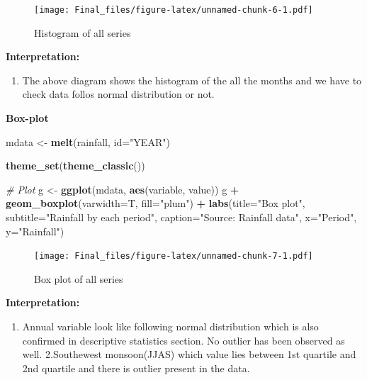 \documentclass[12pt,openany]{book}
\newenvironment{Shaded}{\begin{snugshade}}{\end{snugshade}}
\newcommand{\CommentTok}[1]{\textcolor[rgb]{0.56,0.35,0.01}{\textit{#1}}}
\newcommand{\DataTypeTok}[1]{\textcolor[rgb]{0.13,0.29,0.53}{#1}}
\newcommand{\KeywordTok}[1]{\textcolor[rgb]{0.13,0.29,0.53}{\textbf{#1}}}
\newcommand{\NormalTok}[1]{#1}
\newcommand{\OperatorTok}[1]{\textcolor[rgb]{0.81,0.36,0.00}{\textbf{#1}}}
\newcommand{\StringTok}[1]{\textcolor[rgb]{0.31,0.60,0.02}{#1}}
\providecommand{\tightlist}{%
  \setlength{\itemsep}{0pt}\setlength{\parskip}{0pt}}
\begin{document}
\begin{figure}
\centering
\texttt{[image: Final\_files/figure-latex/unnamed-chunk-6-1.pdf]}
\caption{\label{fig:unnamed-chunk-6}Histogram of all series}
\end{figure}

\textbf{Interpretation:}

\begin{enumerate}
\def\labelenumi{\arabic{enumi}.}
\tightlist
\item
  The above diagram shows the histogram of the all the months and we have to check data follos normal distribution or not.
\end{enumerate}

\textbf{Box-plot}

\begin{Shaded}
\begin{Highlighting}[]
\NormalTok{mdata <-}\StringTok{ }\KeywordTok{melt}\NormalTok{(rainfall, }\DataTypeTok{id=}\StringTok{"YEAR"}\NormalTok{)}

\KeywordTok{theme_set}\NormalTok{(}\KeywordTok{theme_classic}\NormalTok{())}

\CommentTok{# Plot}
\NormalTok{g <-}\StringTok{ }\KeywordTok{ggplot}\NormalTok{(mdata, }\KeywordTok{aes}\NormalTok{(variable, value))}
\NormalTok{g }\OperatorTok{+}\StringTok{ }\KeywordTok{geom_boxplot}\NormalTok{(}\DataTypeTok{varwidth=}\NormalTok{T, }\DataTypeTok{fill=}\StringTok{"plum"}\NormalTok{) }\OperatorTok{+}\StringTok{ }
\StringTok{    }\KeywordTok{labs}\NormalTok{(}\DataTypeTok{title=}\StringTok{"Box plot"}\NormalTok{, }
         \DataTypeTok{subtitle=}\StringTok{"Rainfall by each period"}\NormalTok{,}
         \DataTypeTok{caption=}\StringTok{"Source: Rainfall data"}\NormalTok{,}
         \DataTypeTok{x=}\StringTok{"Period"}\NormalTok{,}
         \DataTypeTok{y=}\StringTok{"Rainfall"}\NormalTok{)}
\end{Highlighting}
\end{Shaded}

\begin{figure}
\centering
\texttt{[image: Final\_files/figure-latex/unnamed-chunk-7-1.pdf]}
\caption{\label{fig:unnamed-chunk-7}Box plot of all series}
\end{figure}

\textbf{Interpretation:}

\begin{enumerate}
\def\labelenumi{\arabic{enumi}.}
\tightlist
\item
  Annual variable look like following normal distribution which is also confirmed in descriptive statistics section. No outlier has been observed as well.
  2.Southewest monsoon(JJAS) which value lies between 1st quartile and 2nd quartile and there is outlier present in the data.
\end{enumerate}
\end{document}
